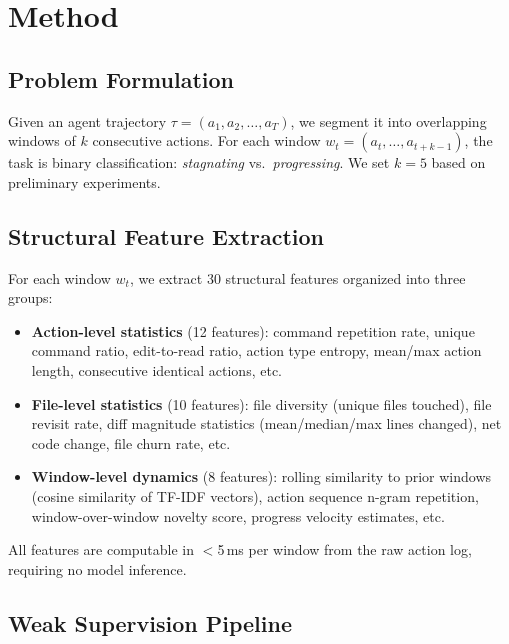 \documentclass[11pt,a4paper]{article}
\begin{document}
\section{Method}
\label{sec:method}

\subsection{Problem Formulation}

Given an agent trajectory $\tau = (a_1, a_2, \ldots, a_T)$, we segment it into overlapping windows of $k$ consecutive actions.
For each window $w_t = (a_t, \ldots, a_{t+k-1})$, the task is binary classification: \emph{stagnating} vs.\ \emph{progressing}.
We set $k{=}5$ based on preliminary experiments.

\subsection{Structural Feature Extraction}

For each window $w_t$, we extract 30 structural features organized into three groups:

\begin{itemize}[leftmargin=*,itemsep=1pt]
\item \textbf{Action-level statistics} (12 features): command repetition rate, unique command ratio, edit-to-read ratio, action type entropy, mean/max action length, consecutive identical actions, etc.
\item \textbf{File-level statistics} (10 features): file diversity (unique files touched), file revisit rate, diff magnitude statistics (mean/median/max lines changed), net code change, file churn rate, etc.
\item \textbf{Window-level dynamics} (8 features): rolling similarity to prior windows (cosine similarity of TF-IDF vectors), action sequence n-gram repetition, window-over-window novelty score, progress velocity estimates, etc.
\end{itemize}

All features are computable in $<$5\,ms per window from the raw action log, requiring no model inference.

\subsection{Weak Supervision Pipeline}
\end{document}
